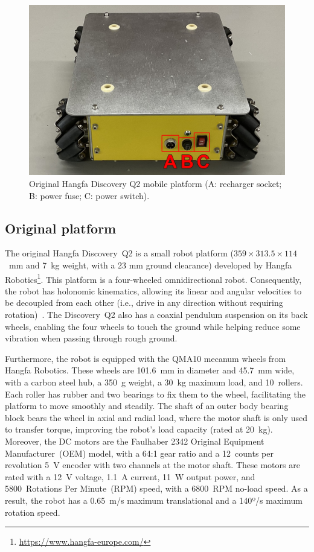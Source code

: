 \documentclass[letterpaper,10pt,conference]{IEEEtran} %
\begin{document}
\begin{figure}[t]
\centering
\includegraphics[width=0.4\columnwidth]{figs/hangfa-discovery-q2_original_annotated.jpg}
\caption{Original Hangfa Discovery Q2 mobile platform
(A: recharger socket; B: power fuse; C: power switch).}
\label{fig:hangfa:original}
\end{figure}

\subsection{Original platform}

The original Hangfa Discovery~Q2
is a small robot platform ($359\times 313.5\times 114$~mm
and 7~kg weight, with a 23 mm ground clearance) developed by
Hangfa Robotics\footnote{\label{note:hangfa}%
\url{https://www.hangfa-europe.com/}}.
This platform is a four-wheeled omnidirectional robot.
Consequently, the robot has holonomic kinematics,
allowing its linear and angular velocities to be decoupled from each other
(i.e., drive in any direction without requiring 
rotation)~\cite{sousa2024icarsc}.
The Discovery~Q2 also has a coaxial pendulum suspension
on its back wheels, enabling the four wheels to touch the ground
while helping reduce some vibration when passing through rough ground.

Furthermore, the robot is equipped with the
QMA10 mecanum wheels from Hangfa Robotics.
These wheels are 101.6~mm in diameter and 45.7~mm wide,
with a carbon steel hub, a 350~g weight, a 30~kg maximum load, and 10~rollers.
Each roller has rubber and two bearings to fix them to the wheel,
facilitating the platform to move smoothly and steadily.
The shaft of an outer body bearing block bears the wheel
in axial and radial load,
where the motor shaft is only used to transfer torque,
improving the robot's load capacity (rated at 20~kg).
Moreover, the DC motors are the
Faulhaber 2342 Original Equipment Manufacturer~(OEM) model,
with a 64:1 gear ratio and a
12~counts per revolution 5~V encoder with two channels at the motor shaft.
These motors are rated with a 12~V voltage, 1.1~A current, 11~W output power,
and 5800~Rotations Per Minute~(RPM) speed, with a 6800~RPM no-load speed.
As a result, the robot has a 0.65~m/s maximum translational and a
140º/s maximum rotation speed.
\end{document}
